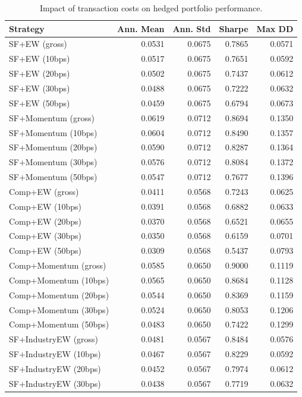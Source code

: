 \begin{table}[htbp]
\centering
\caption{Impact of transaction costs on hedged portfolio performance.}
\label{tab:transaction_costs}
\begin{tabular}{lrrrr}
\toprule
Strategy & Ann. Mean & Ann. Std & Sharpe & Max DD \\
\midrule
SF+EW (gross) & 0.0531 & 0.0675 & 0.7865 & 0.0571 \\
SF+EW (10bps) & 0.0517 & 0.0675 & 0.7651 & 0.0592 \\
SF+EW (20bps) & 0.0502 & 0.0675 & 0.7437 & 0.0612 \\
SF+EW (30bps) & 0.0488 & 0.0675 & 0.7222 & 0.0632 \\
SF+EW (50bps) & 0.0459 & 0.0675 & 0.6794 & 0.0673 \\
SF+Momentum (gross) & 0.0619 & 0.0712 & 0.8694 & 0.1350 \\
SF+Momentum (10bps) & 0.0604 & 0.0712 & 0.8490 & 0.1357 \\
SF+Momentum (20bps) & 0.0590 & 0.0712 & 0.8287 & 0.1364 \\
SF+Momentum (30bps) & 0.0576 & 0.0712 & 0.8084 & 0.1372 \\
SF+Momentum (50bps) & 0.0547 & 0.0712 & 0.7677 & 0.1396 \\
Comp+EW (gross) & 0.0411 & 0.0568 & 0.7243 & 0.0625 \\
Comp+EW (10bps) & 0.0391 & 0.0568 & 0.6882 & 0.0633 \\
Comp+EW (20bps) & 0.0370 & 0.0568 & 0.6521 & 0.0655 \\
Comp+EW (30bps) & 0.0350 & 0.0568 & 0.6159 & 0.0701 \\
Comp+EW (50bps) & 0.0309 & 0.0568 & 0.5437 & 0.0793 \\
Comp+Momentum (gross) & 0.0585 & 0.0650 & 0.9000 & 0.1119 \\
Comp+Momentum (10bps) & 0.0565 & 0.0650 & 0.8684 & 0.1128 \\
Comp+Momentum (20bps) & 0.0544 & 0.0650 & 0.8369 & 0.1159 \\
Comp+Momentum (30bps) & 0.0524 & 0.0650 & 0.8053 & 0.1206 \\
Comp+Momentum (50bps) & 0.0483 & 0.0650 & 0.7422 & 0.1299 \\
SF+IndustryEW (gross) & 0.0481 & 0.0567 & 0.8484 & 0.0576 \\
SF+IndustryEW (10bps) & 0.0467 & 0.0567 & 0.8229 & 0.0592 \\
SF+IndustryEW (20bps) & 0.0452 & 0.0567 & 0.7974 & 0.0612 \\
SF+IndustryEW (30bps) & 0.0438 & 0.0567 & 0.7719 & 0.0632 \\

\end{tabular}
\end{table}
